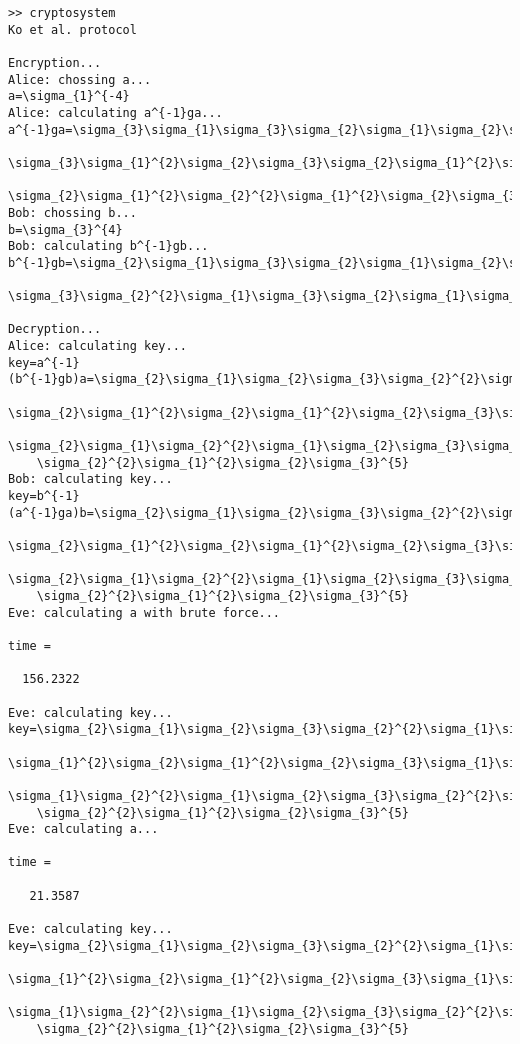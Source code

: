 \begin{lstlisting}
>> cryptosystem
Ko et al. protocol
 
Encryption...
Alice: chossing a...
a=\sigma_{1}^{-4}
Alice: calculating a^{-1}ga...
a^{-1}ga=\sigma_{3}\sigma_{1}\sigma_{3}\sigma_{2}\sigma_{1}\sigma_{2}\sigma_{1}\sigma_{2}
   \sigma_{3}\sigma_{1}^{2}\sigma_{2}\sigma_{3}\sigma_{2}\sigma_{1}^{2}\sigma_{2}\sigma_{3}
   \sigma_{2}\sigma_{1}^{2}\sigma_{2}^{2}\sigma_{1}^{2}\sigma_{2}\sigma_{3}
Bob: chossing b...
b=\sigma_{3}^{4}
Bob: calculating b^{-1}gb...
b^{-1}gb=\sigma_{2}\sigma_{1}\sigma_{3}\sigma_{2}\sigma_{1}\sigma_{2}\sigma_{1}\sigma_{2}
	\sigma_{3}\sigma_{2}^{2}\sigma_{1}\sigma_{3}\sigma_{2}\sigma_{1}\sigma_{2}\sigma_{3}^{5}
 
Decryption...
Alice: calculating key...
key=a^{-1}(b^{-1}gb)a=\sigma_{2}\sigma_{1}\sigma_{2}\sigma_{3}\sigma_{2}^{2}\sigma_{1}\sigma_{3}
    \sigma_{2}\sigma_{1}^{2}\sigma_{2}\sigma_{1}^{2}\sigma_{2}\sigma_{3}\sigma_{1}\sigma_{3}
    \sigma_{2}\sigma_{1}\sigma_{2}^{2}\sigma_{1}\sigma_{2}\sigma_{3}\sigma_{2}^{2}\sigma_{1}^{2}
    \sigma_{2}^{2}\sigma_{1}^{2}\sigma_{2}\sigma_{3}^{5}
Bob: calculating key...
key=b^{-1}(a^{-1}ga)b=\sigma_{2}\sigma_{1}\sigma_{2}\sigma_{3}\sigma_{2}^{2}\sigma_{1}\sigma_{3}
    \sigma_{2}\sigma_{1}^{2}\sigma_{2}\sigma_{1}^{2}\sigma_{2}\sigma_{3}\sigma_{1}\sigma_{3}
    \sigma_{2}\sigma_{1}\sigma_{2}^{2}\sigma_{1}\sigma_{2}\sigma_{3}\sigma_{2}^{2}\sigma_{1}^{2}
    \sigma_{2}^{2}\sigma_{1}^{2}\sigma_{2}\sigma_{3}^{5}
Eve: calculating a with brute force...

time =

  156.2322

Eve: calculating key...
key=\sigma_{2}\sigma_{1}\sigma_{2}\sigma_{3}\sigma_{2}^{2}\sigma_{1}\sigma_{3}\sigma_{2}
    \sigma_{1}^{2}\sigma_{2}\sigma_{1}^{2}\sigma_{2}\sigma_{3}\sigma_{1}\sigma_{3}\sigma_{2}
    \sigma_{1}\sigma_{2}^{2}\sigma_{1}\sigma_{2}\sigma_{3}\sigma_{2}^{2}\sigma_{1}^{2}
    \sigma_{2}^{2}\sigma_{1}^{2}\sigma_{2}\sigma_{3}^{5}
Eve: calculating a...

time =

   21.3587

Eve: calculating key...
key=\sigma_{2}\sigma_{1}\sigma_{2}\sigma_{3}\sigma_{2}^{2}\sigma_{1}\sigma_{3}\sigma_{2}
    \sigma_{1}^{2}\sigma_{2}\sigma_{1}^{2}\sigma_{2}\sigma_{3}\sigma_{1}\sigma_{3}\sigma_{2}
    \sigma_{1}\sigma_{2}^{2}\sigma_{1}\sigma_{2}\sigma_{3}\sigma_{2}^{2}\sigma_{1}^{2}
    \sigma_{2}^{2}\sigma_{1}^{2}\sigma_{2}\sigma_{3}^{5}
\end{lstlisting}

